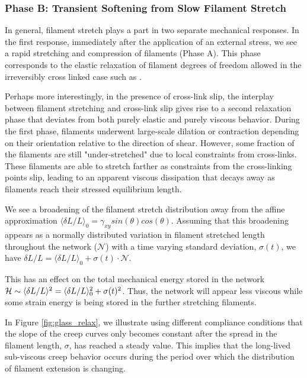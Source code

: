 \documentclass[pre,preprint]{revtex4-1}
\begin{document}
\subsubsection{Phase B: Transient Softening from Slow Filament Stretch}
\label{sec:compliant}
In general, filament stretch plays a part in two separate mechanical responses.  In the first response, immediately after the application of an external stress, we see a rapid stretching and compression of filaments (Phase A). This phase corresponds to the elastic relaxation of filament degrees of freedom allowed in the irreversibly cross linked case such as \cite{theo_hlm,theo_hlm2}.  

Perhaps more interestingly, in the presence of cross-link slip, the interplay between filament stretching and cross-link slip gives rise to a second relaxation phase that deviates from both purely elastic and purely viscous behavior.  During the first phase, filaments underwent large-scale dilation or contraction depending on their orientation relative to the direction of shear.  However, some fraction of the filaments are still "under-stretched" due to local constraints from cross-links.  These filaments are able to stretch farther as constraints from the cross-linking points slip,  leading to an apparent viscous dissipation that decays away as filaments reach their stressed equilibrium length. 

We see a broadening of the filament stretch distribution away from the affine approximation $\langle \delta L/L\rangle_0 = \gamma_{xy}sin(\theta)cos(\theta)$.  Assuming that this broadening appears as a normally distributed variation in filament stretched length throughout the network ($\mathcal{N}$) with a time varying standard deviation, $\sigma(t)$, we have $\delta L/L = \langle \delta L/L\rangle_0 + \sigma(t)\cdot\mathcal{N}$. 

 This has an effect on the total mechanical energy stored in the network ${\cal H} \sim  \langle\delta L/L\rangle^2 = \langle\delta L/L\rangle_0^2 +\sigma(t)^2 $.  Thus, the network will appear less viscous while some strain energy is being stored in the further stretching filaments.  


In Figure \ref{fig:glass_relax}, we illustrate using different compliance conditions that the slope of the creep curves only becomes constant after the spread in the filament length, $\sigma$, has reached a steady value. This implies that the long-lived sub-viscous creep behavior occurs during the period over which the distribution of filament extension is changing. 
\end{document}
